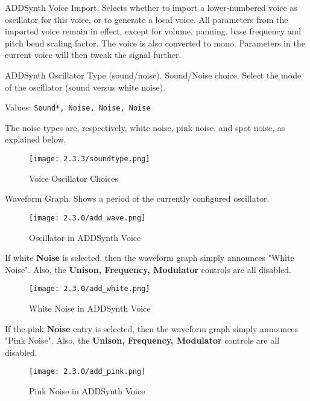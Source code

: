    \setcounter{ItemCounter}{0}      %

  ADDSynth Voice Import. Selects whether to import a lower-numbered voice as
  oscillator for this voice, or to generate a local voice. All parameters from
  the imported voice remain in effect, except for volume, panning, base
  frequency and pitch bend scaling factor. The voice is also converted to mono.
  Parameters in the current voice will then tweak the signal further.

   ADDSynth Oscillator Type (sound/noise).
   Sound/Noise choice.
   Select the mode of the oscillator (sound versus white noise).

   Values: \texttt{Sound*, Noise, Noise, Noise}

   The noise types are, respectively, white noise, pink noise, and spot noise, as
   explained below.

\begin{figure}[H]
   \centering
   \texttt{[image: 2.3.3/soundtype.png]}
   \caption{Voice Oscillator Choices}
   \label{fig:voice_oscillator_choices}
\end{figure}

   Waveform Graph.
   Shows a period of the currently configured oscillator.

\begin{figure}[H]
   \centering
   \texttt{[image: 2.3.0/add\_wave.png]}
   \caption{Oscillator in ADDSynth Voice}
   \label{fig:voice_oscillator_oscillator}
\end{figure}

   If white \textbf{Noise} is selected, then the waveform graph simply announces
   "White Noise".  Also, the \textbf{Unison, Frequency, Modulator} controls are
   all disabled.

\begin{figure}[H]
   \centering
   \texttt{[image: 2.3.0/add\_white.png]}
   \caption{White Noise in ADDSynth Voice}
   \label{fig:voice_oscillator_white_noise}
\end{figure}

   If the pink \textbf{Noise} entry is selected,
   then the waveform graph simply announces "Pink Noise".
   Also, the \textbf{Unison, Frequency, Modulator} controls are
   all disabled.

\begin{figure}[H]
   \centering
   \texttt{[image: 2.3.0/add\_pink.png]}
   \caption{Pink Noise in ADDSynth Voice}
   \label{fig:voice_oscillator_pink_noise}
\end{figure}

